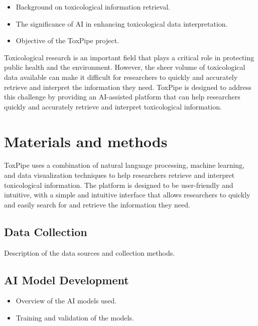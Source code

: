 \documentclass[
  super,
  preprint,
  5p,
  twocolumn]{elsarticle}
\providecommand{\tightlist}{%
  \setlength{\itemsep}{0pt}\setlength{\parskip}{0pt}}\usepackage{longtable,booktabs,array}
\begin{document}
\begin{itemize}
\tightlist
\item
  Background on toxicological information retrieval.
\item
  The significance of AI in enhancing toxicological data interpretation.
\item
  Objective of the ToxPipe project.
\end{itemize}

Toxicological research is an important field that plays a critical role
in protecting public health and the environment. However, the sheer
volume of toxicological data available can make it difficult for
researchers to quickly and accurately retrieve and interpret the
information they need. ToxPipe is designed to address this challenge by
providing an AI-assisted platform that can help researchers quickly and
accurately retrieve and interpret toxicological information.

\hypertarget{materials-and-methods}{%
\section{Materials and methods}\label{materials-and-methods}}

ToxPipe uses a combination of natural language processing, machine
learning, and data visualization techniques to help researchers retrieve
and interpret toxicological information. The platform is designed to be
user-friendly and intuitive, with a simple and intuitive interface that
allows researchers to quickly and easily search for and retrieve the
information they need.

\hypertarget{data-collection}{%
\subsection{Data Collection}\label{data-collection}}

Description of the data sources and collection methods.

\hypertarget{ai-model-development}{%
\subsection{AI Model Development}\label{ai-model-development}}

\begin{itemize}
\tightlist
\item
  Overview of the AI models used.
\item
  Training and validation of the models.
\end{itemize}
\end{document}

